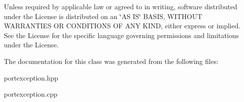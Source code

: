 Unless required by applicable law or agreed to in writing, software distributed under the License is distributed on an \char`\"{}\+A\+S I\+S\char`\"{} B\+A\+S\+I\+S, W\+I\+T\+H\+O\+U\+T W\+A\+R\+R\+A\+N\+T\+I\+E\+S O\+R C\+O\+N\+D\+I\+T\+I\+O\+N\+S O\+F A\+N\+Y K\+I\+N\+D, either express or implied. See the License for the specific language governing permissions and limitations under the License. 

The documentation for this class was generated from the following files\+:\begin{DoxyCompactItemize}
\item 
portexception.\+hpp\item 
portexception.\+cpp\end{DoxyCompactItemize}
